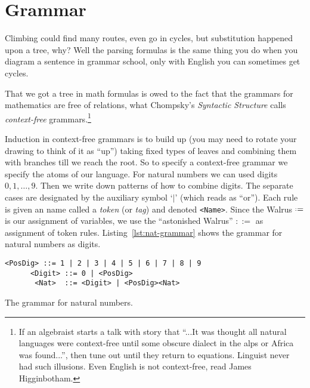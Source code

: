 \section{Grammar}
Climbing could find many routes, even go in cycles, but 
substitution happened upon a tree, why?  Well the parsing 
formulas is the same thing you do when you diagram a sentence in grammar school, only with
English you can sometimes get cycles.  
\begin{center}
\end{center}
That we got a tree in math formulas is owed to the fact
that the grammars for mathematics are free of relations, what Chompsky's 
\emph{Syntactic Structure} calls
\emph{context-free} grammars.\footnote{
    If an algebraist starts a talk with story that ``...It was thought  all natural 
    languages were context-free until some obscure dialect in the alps or Africa was found...'', 
    then tune out until they return to equations.  
    Linguist never had such illusions. Even English is not context-free, read  James Higginbotham.}  

Induction in context-free grammars is to build up (you may need to rotate your drawing to think of it as ``up'')
taking fixed types of leaves and combining them with branches till we reach the root.
So to specify a context-free grammar we specify the atoms of our language.
For natural numbers we can used digits $0,1,\ldots, 9$.  Then we write down patterns of how to 
combine digits.  The separate cases are designated by the auxiliary symbol `$|$' (which reads as ``or'').  Each rule 
is given an name called a \emph{token} (or \emph{tag}) and denoted \lstinline{<Name>}.
Since the Walrus $\defeq$ is our assignment of variables, we use the ``astonished Walrus'' $::=$ as assignment of token rules.
Listing~\ref{lst:nat-grammar} shows the grammar for natural numbers as digits.
\begin{lstfloat}
\begin{lstlisting}[mathescape]
     <PosDig> ::= 1 | 2 | 3 | 4 | 5 | 6 | 7 | 8 | 9 
      <Digit> ::= 0 | <PosDig>
       <Nat>  ::= <Digit> | <PosDig><Nat>
\end{lstlisting}
\caption{The grammar for natural numbers.}
\label{lst:nat-grammar}
\end{lstfloat}

